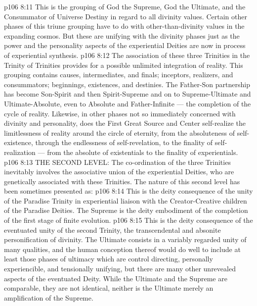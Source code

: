 \vs p106 8:11 \pc {}\bibnobreakspace {} This is the grouping of God the Supreme, God the Ultimate, and the Consummator of Universe Destiny in regard to all divinity values. Certain other phases of this triune grouping have to do with other\hyp{}than\hyp{}divinity values in the expanding cosmos. But these are unifying with the divinity phases just as the power and the personality aspects of the experiential Deities are now in process of experiential synthesis.
\vs p106 8:12 \pc The association of these three Trinities in the Trinity of Trinities provides for a possible unlimited integration of reality. This grouping contains causes, intermediates, and finals; inceptors, realizers, and consummators; beginnings, existences, and destinies. The Father\hyp{}Son partnership has become Son\hyp{}Spirit and then Spirit\hyp{}Supreme and on to Supreme\hyp{}Ultimate and Ultimate\hyp{}Absolute, even to Absolute and Father\hyp{}Infinite --- the completion of the cycle of reality. Likewise, in other phases not so immediately concerned with divinity and personality, does the First Great Source and Center self\hyp{}realize the limitlessness of reality around the circle of eternity, from the absoluteness of self\hyp{}existence, through the endlessness of self\hyp{}revelation, to the finality of self\hyp{}realization --- from the absolute of existentials to the finality of experientials.
\vs p106 8:13 \pc THE SECOND LEVEL: The co\hyp{}ordination of the three Trinities inevitably involves the associative union of the experiential Deities, who are genetically associated with these Trinities. The nature of this second level has been sometimes presented as:
\vs p106 8:14 \bibnobreakspace {} This is the deity consequence of the unity of the Paradise Trinity in experiential liaison with the Creator\hyp{}Creative children of the Paradise Deities. The Supreme is the deity embodiment of the completion of the first stage of finite evolution.
\vs p106 8:15 \pc {}\bibnobreakspace {} This is the deity consequence of the eventuated unity of the second Trinity, the transcendental and absonite personification of divinity. The Ultimate consists in a variably regarded unity of many qualities, and the human conception thereof would do well to include at least those phases of ultimacy which are control directing, personally experiencible, and tensionally unifying, but there are many other unrevealed aspects of the eventuated Deity. While the Ultimate and the Supreme are comparable, they are not identical, neither is the Ultimate merely an amplification of the Supreme.
